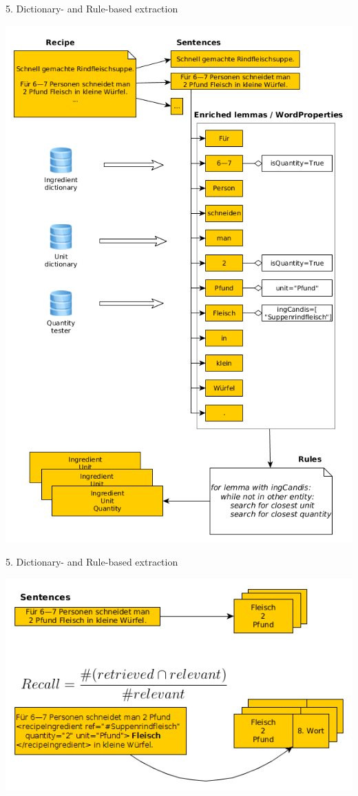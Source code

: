 \documentclass[12pt]{beamer}
\begin{document}
\begin{frame}{5. Dictionary- and Rule-based extraction}
	\begin{center}
		\includegraphics[width=1\linewidth, height=\textheight,keepaspectratio]{../../Images/dictBasedExtraction}
	\end{center}
\end{frame}

\begin{frame}{5. Dictionary- and Rule-based extraction}
	\begin{center}
		\includegraphics[width=1\linewidth, height=\textheight,keepaspectratio]{../../Images/recall}
	\end{center}
\end{frame}
\end{document}
